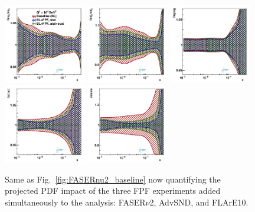 \begin{figure}[t]
\centering
\includegraphics[width=0.32\textwidth]{plots/proton_fasernu2/FPF/fred05fcorr05_FPF_q2_10000_pdf_uv_ratio.pdf}
\includegraphics[width=0.32\textwidth]{plots/proton_fasernu2/FPF/fred05fcorr05_FPF_q2_10000_pdf_dv_ratio.pdf}
\includegraphics[width=0.32\textwidth]{plots/proton_fasernu2/FPF/fred05fcorr05_FPF_q2_10000_pdf_g_ratio.pdf}\\
\includegraphics[width=0.32\textwidth]{plots/proton_fasernu2/FPF/fred05fcorr05_FPF_q2_10000_pdf_Sea_ratio.pdf}
\includegraphics[width=0.32\textwidth]{plots/proton_fasernu2/FPF/fred05fcorr05_FPF_q2_10000_pdf_s_ratio.pdf}
\caption{
  Same as Fig.~\ref{fig:FASERnu2_baseline} now quantifying the
  projected PDF impact of the three FPF experiments added simultaneously to
  the analysis: FASER$\nu$2, AdvSND, and FLArE10. 
}
\label{fig:FPF_combined}
\end{figure}

